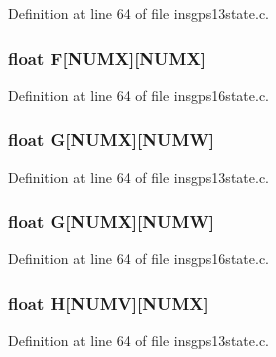 Definition at line 64 of file insgps13state.\-c.

\hypertarget{group___i_n_s_g_p_s_ga8df5a9c6b80931e9a78e1ce3aa7fc8d7}{
\subsubsection[{F}]{\setlength{\rightskip}{0pt plus 5cm}float F\mbox{[}N\-U\-M\-X\mbox{]}\mbox{[}N\-U\-M\-X\mbox{]}}}\label{group___i_n_s_g_p_s_ga8df5a9c6b80931e9a78e1ce3aa7fc8d7}


Definition at line 64 of file insgps16state.\-c.

\hypertarget{group___i_n_s_g_p_s_ga728acb2fd56f38a4cab69ede7b3a027e}{
\subsubsection[{G}]{\setlength{\rightskip}{0pt plus 5cm}float G\mbox{[}N\-U\-M\-X\mbox{]}\mbox{[}N\-U\-M\-W\mbox{]}}}\label{group___i_n_s_g_p_s_ga728acb2fd56f38a4cab69ede7b3a027e}


Definition at line 64 of file insgps13state.\-c.

\hypertarget{group___i_n_s_g_p_s_ga728acb2fd56f38a4cab69ede7b3a027e}{
\subsubsection[{G}]{\setlength{\rightskip}{0pt plus 5cm}float G\mbox{[}N\-U\-M\-X\mbox{]}\mbox{[}N\-U\-M\-W\mbox{]}}}\label{group___i_n_s_g_p_s_ga728acb2fd56f38a4cab69ede7b3a027e}


Definition at line 64 of file insgps16state.\-c.

\hypertarget{group___i_n_s_g_p_s_ga4080397a0d248e4c99d6f284b187f206}{
\subsubsection[{H}]{\setlength{\rightskip}{0pt plus 5cm}float H\mbox{[}N\-U\-M\-V\mbox{]}\mbox{[}N\-U\-M\-X\mbox{]}}}\label{group___i_n_s_g_p_s_ga4080397a0d248e4c99d6f284b187f206}


Definition at line 64 of file insgps13state.\-c.


